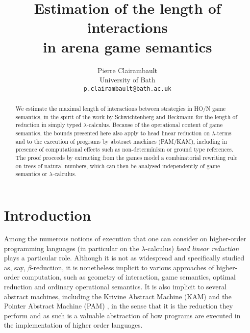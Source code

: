 \documentclass{article}
\begin{document}
\title{Estimation of the length of interactions\\ in arena game semantics}
\author{Pierre Clairambault\\
University of Bath\\
\texttt{p.clairambault@bath.ac.uk}}
\date{}
\maketitle
\begin{abstract}
We estimate the maximal length of interactions between strategies in HO/N game semantics, in the spirit of the work by Schwichtenberg and Beckmann for the length of reduction in 
simply typed $\lambda$-calculus.
Because of the operational content of game semantics, the bounds presented here also apply to head linear reduction on $\lambda$-terms and to the execution of
programs by abstract machines (PAM/KAM), including in presence of computational effects such as non-determinism or ground type references. The proof proceeds by extracting from
the games model a combinatorial rewriting rule on trees of natural numbers, which can then be analysed independently of game semantics or $\lambda$-calculus.
\end{abstract}



\section{Introduction}

Among the numerous notions of execution that one can consider on higher-order programming languages (in particular on the $\lambda$-calculus) \emph{head linear reduction} \cite{danos:abstract} plays a particular role. Although
it is not as widespread and specifically studied as, say, $\beta$-reduction, it is nonetheless implicit to various approaches of higher-order computation, such as geometry of interaction, game semantics, optimal
reduction and ordinary operational semantics. It is also implicit to several abstract machines, including the Krivine Abstract Machine (KAM) \cite{krivine1985interpreteur} and the Pointer Abstract Machine (PAM) \cite{danos:abstract}, 
in the sense that it is the reduction they perform \cite{danos:abstract,phd} and as such is a valuable abstraction of how programs are executed in the implementation of higher order languages. 
\end{document}
